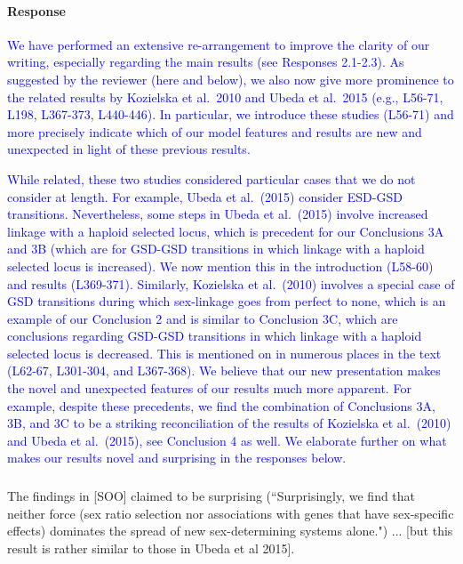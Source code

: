 \documentclass[10pt,letterpaper]{article}
\begin{document}
\noindent\paragraph{Response}
\textcolor{blue}{
We have performed an extensive re-arrangement to improve the clarity of our writing, especially regarding the main results (see Responses 2.1-2.3). 
As suggested by the reviewer (here and below), we also now give more prominence to the related results by Kozielska et al.\ 2010 and Ubeda et al.\ 2015 (e.g., L56-71, L198, L367-373, L440-446). 
In particular, we introduce these studies (L56-71) and more precisely indicate which of our model features and results are new and unexpected in light of these previous results.
}

\textcolor{blue}{
While related, these two studies considered particular cases that we do not consider at length. 
For example, Ubeda et al.\ (2015) consider ESD-GSD transitions. 
Nevertheless, some steps in Ubeda et al.\ (2015) involve increased linkage with a haploid selected locus, which is precedent for our Conclusions 3A and 3B (which are for GSD-GSD transitions in which linkage with a haploid selected locus is increased).
We now mention this in the introduction (L58-60) and results (L369-371). %
Similarly, Kozielska et al.\ (2010) involves a special case of GSD transitions during which sex-linkage goes from perfect to none, which is an example of our Conclusion 2 and is similar to Conclusion 3C, which are conclusions regarding GSD-GSD transitions in which linkage with a haploid selected locus is decreased.
This is mentioned on in numerous places in the text (L62-67, L301-304, and L367-368). 
We believe that our new presentation makes the novel and unexpected features of our results much more apparent. 
For example, despite these precedents, we find the combination of Conclusions 3A, 3B, and 3C to be a striking reconciliation of the results of Kozielska et al.\ (2010) and Ubeda et al.\ (2015), see Conclusion 4 as well. 
We elaborate further on what makes our results novel and surprising in the responses below.
}

\noindent\subsubsection{}
The findings in [SOO] claimed to be surprising (``Surprisingly, we find that neither force (sex ratio selection nor associations with genes that have sex-specific effects) dominates the spread of new sex-determining systems alone.") ... [but this result is rather similar to those in Ubeda et al 2015]. 
\end{document}
